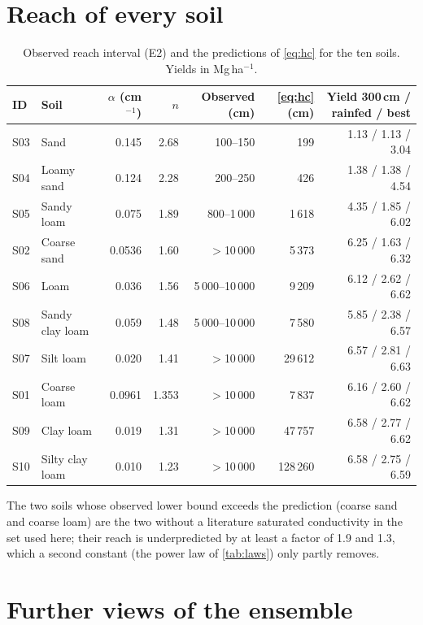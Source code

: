 \section{Reach of every soil}\label{app:reach}
\begin{table}[H]\centering\small
\caption{Observed reach interval (E2) and the predictions of \cref{eq:hc} for the ten soils. Yields in Mg\,ha$^{-1}$.}\label{tab:reachall}
\footnotesize\setlength{\tabcolsep}{4pt}
\begin{tabular}{@{}llrrrrr@{}}
\toprule
ID & Soil & $\alpha$ (cm$^{-1}$) & $n$ & Observed (cm) & \cref{eq:hc} (cm) & Yield 300\,cm / rainfed / best\\\midrule
S03 & Sand & 0.145 & 2.68 & 100--150 & 199 & 1.13 / 1.13 / 3.04\\
S04 & Loamy sand & 0.124 & 2.28 & 200--250 & 426 & 1.38 / 1.38 / 4.54\\
S05 & Sandy loam & 0.075 & 1.89 & 800--1\,000 & 1\,618 & 4.35 / 1.85 / 6.02\\
S02 & Coarse sand & 0.0536 & 1.60 & $>$10\,000 & 5\,373 & 6.25 / 1.63 / 6.32\\
S06 & Loam & 0.036 & 1.56 & 5\,000--10\,000 & 9\,209 & 6.12 / 2.62 / 6.62\\
S08 & Sandy clay loam & 0.059 & 1.48 & 5\,000--10\,000 & 7\,580 & 5.85 / 2.38 / 6.57\\
S07 & Silt loam & 0.020 & 1.41 & $>$10\,000 & 29\,612 & 6.57 / 2.81 / 6.63\\
S01 & Coarse loam & 0.0961 & 1.353 & $>$10\,000 & 7\,837 & 6.16 / 2.60 / 6.62\\
S09 & Clay loam & 0.019 & 1.31 & $>$10\,000 & 47\,757 & 6.58 / 2.77 / 6.62\\
S10 & Silty clay loam & 0.010 & 1.23 & $>$10\,000 & 128\,260 & 6.58 / 2.75 / 6.59\\\bottomrule
\end{tabular}
\end{table}
The two soils whose observed lower bound exceeds the prediction (coarse sand and coarse loam) are the two without a literature saturated conductivity in the set used here; their reach is underpredicted by at least a factor of 1.9 and 1.3, which a second constant (the power law of \cref{tab:laws}) only partly removes.

\section{Further views of the ensemble}\label{app:further}

